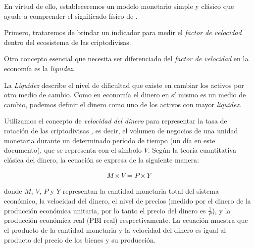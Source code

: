 En virtud de ello, estableceremos un modelo monetario simple y clásico que ayude a comprender el significado físico de \nr.

Primero, trataremos de brindar un indicador para medir el \emph{factor de velocidad} dentro del ecosistema de las criptodivisas.

Otro concepto esencial que necesita ser diferenciado del \emph{factor de velocidad} en la economía es la \emph{liquidez}.

La \emph{Liquidez} describe el nivel de dificultad que existe en cambiar los activos por otro medio de cambio. Como en economía el dinero en sí mismo es un medio de cambio, podemos definir el dinero como uno de los activos con mayor \emph{liquidez}.


Utilizamos el concepto de \textit{velocidad del dinero} para representar la tasa de rotación de las criptodivisas \cite{selden}, es decir, el volumen de negocios de una unidad monetaria durante un determinado período de tiempo (un día en este documento), que se representa con el símbolo $V$. Según la teoría cuantitativa clásica del dinero, la ecuación se expresa de la siguiente manera:

\begin{align}
M\times V=P\times Y
\label{eq:currency}
\end{align}

\noindent donde $M$, $V$, $P$ y $Y$ representan la cantidad monetaria total del sistema económico, la velocidad del dinero, el nivel de precios (medido por el dinero de la producción económica unitaria, por lo tanto el precio del dinero es $\frac{1}{P}$), y la producción económica real (PBI real) respectivamente. La ecuación muestra que el producto de la cantidad monetaria y la velocidad del dinero es igual al producto del precio de los bienes y su producción.

